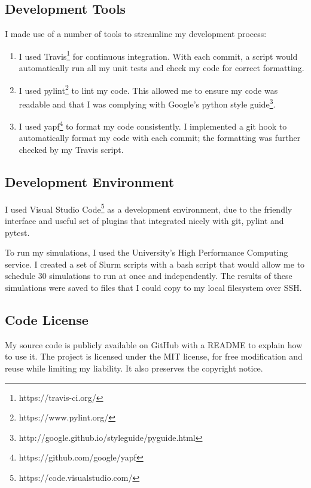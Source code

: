 \documentclass[12pt,a4paper,twoside,openright]{report}
\begin{document}
\subsection{Development Tools}

I made use of a number of tools to streamline my development process:

\begin{enumerate}
	\item I used Travis\footnote{https://travis-ci.org/} for continuous integration. With each commit, a script would automatically run all my unit tests and check my code for correct formatting.
	\item I used pylint\footnote{https://www.pylint.org/} to lint my code. This allowed me to ensure my code was readable and that I was complying with Google's python style guide\footnote{http://google.github.io/styleguide/pyguide.html}.
	\item I used yapf\footnote{https://github.com/google/yapf} to format my code consistently. I implemented a git hook to automatically format my code with each commit; the formatting was further checked by my Travis script.
\end{enumerate}

\subsection{Development Environment}

I used Visual Studio Code\footnote{https://code.visualstudio.com/} as a development environment, due to the friendly interface and useful set of plugins that integrated nicely with git, pylint and pytest. 

To run my simulations, I used the University's High Performance Computing service. I created a set of Slurm scripts with a bash script that would allow me to schedule 30 simulations to run at once and independently. The results of these simulations were saved to files that I could copy to my local filesystem over SSH.

\subsection{Code License}

My source code is publicly available on GitHub with a README to explain how to use it. The project is licensed under the MIT license, for free modification and reuse while limiting my liability. It also preserves the copyright notice.
\end{document}
